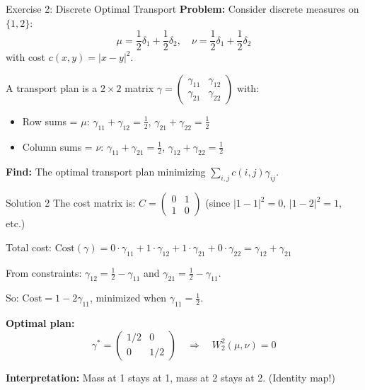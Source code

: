 \documentclass[aspectratio=169]{beamer}
\begin{document}
\begin{frame}{Exercise 2: Discrete Optimal Transport}
\textbf{Problem:} Consider discrete measures on $\{1, 2\}$:
\[
\mu = \frac{1}{2}\delta_1 + \frac{1}{2}\delta_2, \quad \nu = \frac{1}{2}\delta_1 + \frac{1}{2}\delta_2
\]
with cost $c(x,y) = |x-y|^2$.

\vspace{0.3cm}
A transport plan is a $2 \times 2$ matrix $\gamma = \begin{pmatrix} \gamma_{11} & \gamma_{12} \\ \gamma_{21} & \gamma_{22} \end{pmatrix}$ with:
\begin{itemize}
    \item Row sums = $\mu$: $\gamma_{11} + \gamma_{12} = \frac{1}{2}$, $\gamma_{21} + \gamma_{22} = \frac{1}{2}$
    \item Column sums = $\nu$: $\gamma_{11} + \gamma_{21} = \frac{1}{2}$, $\gamma_{12} + \gamma_{22} = \frac{1}{2}$
\end{itemize}

\vspace{0.3cm}
\textbf{Find:} The optimal transport plan minimizing $\sum_{i,j} c(i,j)\gamma_{ij}$.
\end{frame}

\begin{frame}{Solution 2}
The cost matrix is: $C = \begin{pmatrix} 0 & 1 \\ 1 & 0 \end{pmatrix}$ (since $|1-1|^2=0$, $|1-2|^2=1$, etc.)

\vspace{0.3cm}
Total cost: $\text{Cost}(\gamma) = 0 \cdot \gamma_{11} + 1 \cdot \gamma_{12} + 1 \cdot \gamma_{21} + 0 \cdot \gamma_{22} = \gamma_{12} + \gamma_{21}$

\vspace{0.3cm}
From constraints: $\gamma_{12} = \frac{1}{2} - \gamma_{11}$ and $\gamma_{21} = \frac{1}{2} - \gamma_{11}$.

So: $\text{Cost} = 1 - 2\gamma_{11}$, minimized when $\gamma_{11} = \frac{1}{2}$.

\vspace{0.3cm}
\textbf{Optimal plan:}
\[
\gamma^* = \begin{pmatrix} 1/2 & 0 \\ 0 & 1/2 \end{pmatrix} \quad \Rightarrow \quad W_2^2(\mu,\nu) = 0
\]

\textbf{Interpretation:} Mass at 1 stays at 1, mass at 2 stays at 2. (Identity map!)
\end{frame}
\end{document}
